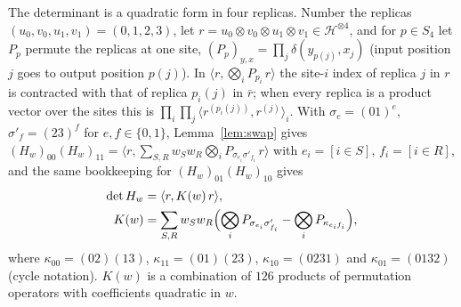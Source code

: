 \documentclass[aps,pra,twocolumn,superscriptaddress,nofootinbib,longbibliography]{revtex4-2}
\newcommand{\Hh}{\mathcal H}
\newcommand{\ip}[2]{\langle #1,#2\rangle}
\theoremstyle{plain}
\theoremstyle{definition}
\theoremstyle{remark}
\begin{document}
The determinant is a quadratic form in four replicas. Number the replicas $(u_0,v_0,u_1,v_1)=(0,1,2,3)$, let $r=u_0\otimes v_0\otimes u_1\otimes v_1\in\Hh^{\otimes4}$, and for $p\in S_4$ let $P_p$ permute the replicas at one site, $(P_p)_{y,x}=\prod_j\delta(y_{p(j)},x_j)$ (input position $j$ goes to output position $p(j)$). In $\ip r{\bigotimes_iP_{p_i}\,r}$ the site-$i$ index of replica $j$ in $r$ is contracted with that of replica $p_i(j)$ in $\bar r$; when every replica is a product vector over the sites this is $\prod_i\prod_j\ip{r^{(p_i(j))}}{r^{(j)}}_i$. With $\sigma_e=(01)^e$, $\sigma'_f=(23)^f$ for $e,f\in\{0,1\}$, Lemma~\ref{lem:swap} gives $(H_w)_{00}(H_w)_{11}=\ip r{\sum_{S,R}w_Sw_R\bigotimes_iP_{\sigma_{e_i}\sigma'_{f_i}}\,r}$ with $e_i=[i\in S]$, $f_i=[i\in R]$, and the same bookkeeping for $(H_w)_{01}(H_w)_{10}$ gives
\begin{equation}\label{eq:K}
\begin{aligned}
\det H_w&=\ip r{K(w)\,r},\\
K(w)&=\sum_{S,R}w_Sw_R\Bigl(\bigotimes_iP_{\sigma_{e_i}\sigma'_{f_i}}-\bigotimes_iP_{\kappa_{e_if_i}}\Bigr),
\end{aligned}
\end{equation}
where $\kappa_{00}=(02)(13)$, $\kappa_{11}=(01)(23)$, $\kappa_{10}=(0231)$ and $\kappa_{01}=(0132)$ (cycle notation). $K(w)$ is a combination of $126$ products of permutation operators with coefficients quadratic in $w$.
\end{document}
